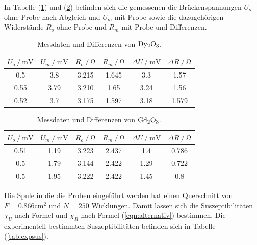 \noindent
In Tabelle (\ref{tab:exp1}) und (\ref{tab:exp2}) befinden sich die gemessenen die Brückenspannungen $U_o$ ohne Probe nach Abgleich und $U_m$ mit Probe sowie die dazugehörigen Widerstände
$R_o$ ohne Probe und $R_m$ mit Probe und Differenzen. 

\begin{table}
    \centering
    \begin{tabular}{c c c c c c}
        \toprule
        {$U_o \mathbin{/} \si{\milli\volt}$} & {$U_m \mathbin{/} \si{\milli\volt}$} & {$R_o \mathbin{/} \si{\ohm}$} & {$R_m \mathbin{/} \si{\ohm}$} & {$\Delta U \mathbin{/} \si{\milli\volt}$} & {$\Delta R \mathbin{/} \si{\ohm}$} \\
    \midrule
    0.5     &   3.8   &     3.215     &     1.645    &   3.3   &  1.57  \\
    0.55    &   3.79  &     3.210     &     1.65     &   3.24  &  1.56  \\ 
    0.52    &   3.7   &     3.175     &     1.597    &   3.18  &  1.579 \\
    \bottomrule
\end{tabular}
\caption{Messdaten und Differenzen von $\ce{Dy2O3}$.}
\label{tab:exp1}
\end{table}

\begin{table}
    \centering
    \begin{tabular}{c c c c c c}
        \toprule
        {$U_o \mathbin{/} \si{\milli\volt}$} & {$U_m \mathbin{/} \si{\milli\volt}$} & {$R_o \mathbin{/} \si{\ohm}$} & {$R_m \mathbin{/} \si{\ohm}$} & {$\Delta U \mathbin{/} \si{\milli\volt}$} & {$\Delta R \mathbin{/} \si{\ohm}$} \\
    \midrule
    0.51    &   1.19   &     3.223     &     2.437    &   1.4   &  0.786  \\
    0.5     &   1.79   &     3.144     &     2.422    &   1.29  &  0.722  \\ 
    0.5     &   1.95   &     3.222     &     2.422    &   1.45  &  0.8    \\
    \bottomrule
\end{tabular}
\caption{Messdaten und Differenzen von $\ce{Gd2O3}$.}
\label{tab:exp2}
\end{table}

\noindent 
Die Spule in die die Proben eingeführt werden hat einen Querschnitt von $F=0.866\si{\centi\meter\squared}$ und $N=250$ Wicklungen.
Damit lassen sich die Suszeptibilitäten $\chi_U$ nach Formel %
und $\chi_R$ nach Formel (\ref{eqn:alternativ})
bestimmen.
Die experimentell bestimmten Suszeptibilitäten befinden sich in Tabelle (\ref{tab:expsus}).

